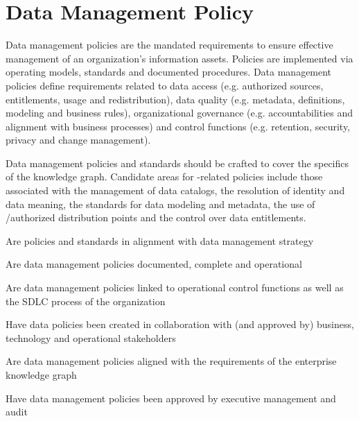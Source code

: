 \section{Data Management Policy}\label{sec:ekgmm-b-4-2} %

Data management policies are the mandated requirements to ensure effective management of an organization’s information assets.
Policies are implemented via operating models, standards and documented procedures.
Data management policies define requirements related to data access (e.g. authorized sources, entitlements, usage and redistribution),
data quality (e.g. metadata, definitions, modeling and business rules), organizational governance (e.g. accountabilities and alignment with business processes) and control functions (e.g. retention, security, privacy and change management).

\kgmmekgrationalesection

Data management policies and standards should be crafted to cover the specifics of the knowledge graph.
Candidate areas for -related policies include those associated with the management of data catalogs, the resolution of identity and data meaning, the standards for data modeling and metadata, the use of /authorized distribution points and the control over data entitlements.

\kgmmcorequestionssection

\begin{core-questions}

  \item [\thesection.1] Are policies and standards in alignment with data management strategy
  \item [\thesection.2] Are data management policies documented, complete and operational
  \item [\thesection.3] Are data management policies linked to operational control functions as well as the SDLC process of the organization
  \item [\thesection.4] Have data policies been created in collaboration with (and approved by) business, technology and operational stakeholders
  \item [\thesection.5] Are data management policies aligned with the requirements of the enterprise knowledge graph
  \item [\thesection.6] Have data management policies been approved by executive management and audit

\end{core-questions}

